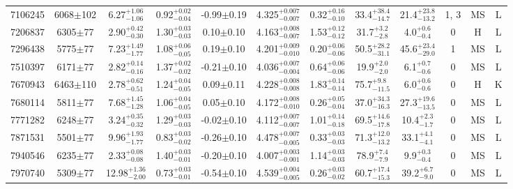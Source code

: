 \begin{landscape}
\begin{longtable}{c|ccccc|ccc|ccc}
	7106245 & 6068$\pm$102   & 6.27$_{-1.06}^{+1.06}$    & 0.92$_{-0.04}^{+0.02}$ & -0.99$\pm$0.19    & 4.325$_{-0.007}^{+0.007}$ & 0.32$_{-0.10}^{+0.16}$ & 33.4$_{-14.7}^{+38.4}$    & 21.4$_{-13.2}^{+23.8}$   & 1, 3 &        MS & L \\
	7206837 & 6305$\pm$77    & 2.90$_{-0.30}^{+0.42}$    & 1.30$_{-0.03}^{+0.03}$ & 0.10$\pm$0.10     & 4.163$_{-0.007}^{+0.008}$ & 1.53$_{-0.12}^{+0.12}$ & 31.7$_{-2.8}^{+3.2}$      & 4.0$_{-0.4}^{+0.6}$      & 0 &        H & L \\
	7296438 & 5775$\pm$77    & 7.23$_{-1.77}^{+1.49}$    & 1.08$_{-0.05}^{+0.06}$ & 0.19$\pm$0.10     & 4.201$_{-0.010}^{+0.009}$ & 0.20$_{-0.06}^{+0.06}$ & 50.5$_{-31.1}^{+28.2}$    & 45.6$_{-29.0}^{+23.4}$   & 1 &        MS & L \\
	7510397 & 6171$\pm$77    & 2.82$_{-0.16}^{+0.14}$    & 1.37$_{-0.02}^{+0.02}$ & -0.21$\pm$0.10    & 4.036$_{-0.004}^{+0.007}$ & 0.64$_{-0.06}^{+0.06}$ & 19.9$_{-2.0}^{+2.0}$      & 6.1$_{-0.6}^{+0.7}$      & 0 &        MS & L \\
	7670943 & 6463$\pm$110   & 2.78$_{-0.51}^{+0.62}$    & 1.24$_{-0.05}^{+0.04}$ & 0.09$\pm$0.11     & 4.228$_{-0.008}^{+0.008}$ & 1.83$_{-0.14}^{+0.14}$ & 75.7$_{-11.5}^{+9.8}$     & 6.0$_{-0.6}^{+0.6}$      & 0 &        H & K \\
	7680114 & 5811$\pm$77    & 7.68$_{-1.28}^{+1.45}$    & 1.06$_{-0.05}^{+0.04}$ & 0.05$\pm$0.10     & 4.172$_{-0.010}^{+0.008}$ & 0.26$_{-0.04}^{+0.05}$ & 37.0$_{-16.3}^{+34.3}$    & 27.3$_{-13.5}^{+19.6}$   & 0 &        MS & L \\
	7771282 & 6248$\pm$77    & 3.24$_{-0.32}^{+0.35}$    & 1.29$_{-0.03}^{+0.03}$ & -0.02$\pm$0.10    & 4.112$_{-0.007}^{+0.007}$ & 1.01$_{-0.18}^{+0.14}$ & 69.5$_{-17.8}^{+14.6}$    & 10.4$_{-1.7}^{+2.3}$     & 0 &        MS & L \\
	7871531 & 5501$\pm$77    & 9.96$_{-1.77}^{+1.93}$    & 0.83$_{-0.02}^{+0.03}$ & -0.26$\pm$0.10    & 4.478$_{-0.005}^{+0.007}$ & 0.33$_{-0.03}^{+0.03}$ & 71.3$_{-13.2}^{+12.0}$    & 33.1$_{-4.1}^{+4.1}$     & 0 &        MS & L \\
	7940546 & 6235$\pm$77    & 2.33$_{-0.08}^{+0.08}$    & 1.40$_{-0.01}^{+0.03}$ & -0.20$\pm$0.10    & 4.007$_{-0.001}^{+0.003}$ & 1.14$_{-0.03}^{+0.03}$ & 78.9$_{-7.9}^{+7.4}$      & 9.9$_{-0.4}^{+0.3}$      & 0 &        MS & L \\
	7970740 & 5309$\pm$77    & 12.98$_{-2.00}^{+1.36}$   & 0.73$_{-0.01}^{+0.03}$ & -0.54$\pm$0.10    & 4.539$_{-0.005}^{+0.004}$ & 0.26$_{-0.02}^{+0.03}$ & 60.7$_{-15.3}^{+17.4}$    & 39.2$_{-9.0}^{+6.7}$     & 0 &        MS & L \\

\end{longtable}
\end{landscape}
